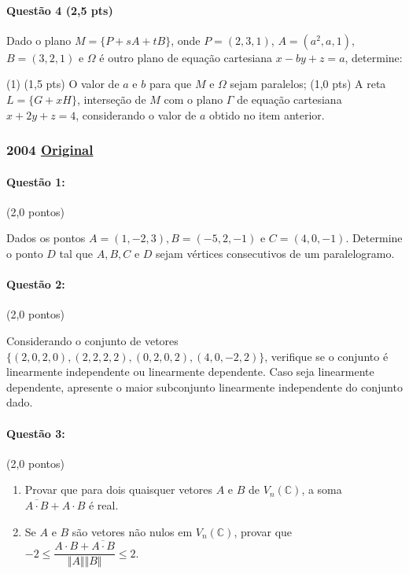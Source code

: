 \documentclass[12pt,a4paper]{article}
\newcommand{\norm}[1]{\Vert #1 \Vert}
\newcommand{\original}[1]{\tiny \href{#1}{Original} \normalsize}
\begin{document}
\paragraph{Questão 4 (2,5 pts)} Dado o plano $M=\{P+sA+tB\}$, onde $P=(2,3,1)$, $A=(a^2, a, 1)$, $B=(3,2,1)$ e $\Omega$ é outro plano de equação cartesiana $x-by+z=a$, determine:
\begin{tasks}(1)
\task (1,5 pts) O valor de $a$ e $b$ para que $M$ e $\Omega$ sejam paralelos;
\task (1,0 pts) A reta $L=\{G+xH\}$, interseção de $M$ com o plano $\Gamma$ de equação cartesiana $x+2y+z=4$, considerando o valor de $a$ obtido no item anterior.
\end{tasks}

\newpage

\subsubsection{2004 \original{https://drive.google.com/file/d/1y9u_e-tM-S_zBRItyYFeKysdHO2Qgqep/view?usp=sharing}}

\paragraph{Questão 1:} (2,0 pontos)

Dados os pontos $A=(1,-2,3), B=(-5,2,-1)$ e $C=(4,0,-1)$. Determine o ponto $D$ tal que $A,B,C$ e $D$ sejam vértices consecutivos de um paralelogramo.

\paragraph{Questão 2:} (2,0 pontos)

Considerando o conjunto de vetores $\{(2,0,2,0),(2,2,2,2),(0,2,0,2),(4,0,-2,2)\}$, verifique se o conjunto é linearmente independente ou linearmente dependente. Caso seja linearmente dependente, apresente o maior subconjunto linearmente independente do conjunto dado.

\paragraph{Questão 3:} (2,0 pontos)

\begin{enumerate}[label=(\alph*)]
\item Provar que para dois quaisquer vetores $A$ e $B$ de $V_n(\mathbb{C})$, a soma $\overline{A\cdot B}+A\cdot B$ é real. 
\item Se $A$ e $B$ são vetores não nulos em $V_n(\mathbb{C})$, provar que $-2 \leq \dfrac{A\cdot B + \overline{A\cdot B}}{\norm{A}\norm{B}} \leq 2$.
\end{enumerate}
\end{document}
